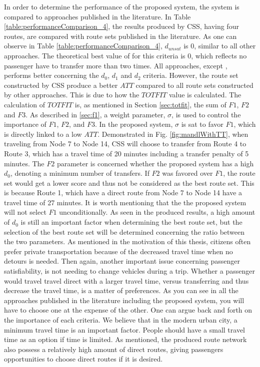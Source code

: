 In order to determine the performance of the proposed system, the system is compared to approaches published in the literature. In Table \vref{table:performanceComparison_4}, the results produced by CSS, having four routes, are compared with route sets published in the literature. As one can observe in Table \vref{table:performanceComparison_4},  $d_{unsat}$ is 0, similar to all other approaches. The theoretical best value of for this criteria is 0, which reflects no passenger have to transfer more than two times. All approaches, except \citep{mandl79, kidwai98, chakroborty02}, performs better concerning the $d_0$, $d_1$ and $d_2$ criteria. However, the route set constructed by CSS produce a better $ATT$ compared to all route sets constructed by  other approaches. This is due to how the $TOTFIT$ value is calculated. The calculation of $TOTFIT$ is, as mentioned in Section \vref{sec:totfit}, the sum of $F1$, $F2$ and $F3$. As described in \vref{sec:f1}, a weight parameter, $\sigma$, is used to control the importance of $F1$, $F2$, and $F3$. In the proposed system, $\sigma$ is sat to favor $F1$, which is directly linked to a low $ATT$. Demonstrated in Fig. \vref{fig:mandlWithTT}, when traveling from Node 7 to Node 14, CSS will choose to transfer from Route 4 to Route 3, which has a travel time of 20 minutes including a transfer penalty of 5 minutes. The $F2$ parameter is concerned whether the proposed system has a high $d_0$, denoting a minimum number of transfers. If $F2$ was favored over $F1$, the route set would get a lower score and thus not be considered as the best route set. This is because Route 1, which have a direct route from Node 7 to Node 14 have a travel time of 27 minutes. It is worth mentioning that the the proposed system will not select $F1$ unconditionally. As seen in the produced results, a high amount of $d_0$ is still an important factor when determining the best route set, but the selection of the best route set will be determined concerning the ratio between the two parameters. As mentioned in the motivation of this thesis, citizens often prefer private transportation because of the decreased travel time when no detours is needed. Then again, another important issue concerning passenger satisfiability, is not needing to change vehicles during a trip. Whether a passenger would travel travel direct with a larger travel time, versus transferring and thus decrease the travel time, is a matter of preferences. As you can see in all the approaches published in the literature including the proposed system, you will have to choose one at the expense of the other. One can argue back and forth on the importance of each criteria. We believe that in the modern urban city, a minimum travel time is an important factor. People should have a small travel time as an option if time is limited. As mentioned, the produced route network also possess a relatively high amount of direct routes, giving passengers opportunities to choose direct routes if it is desired. 
